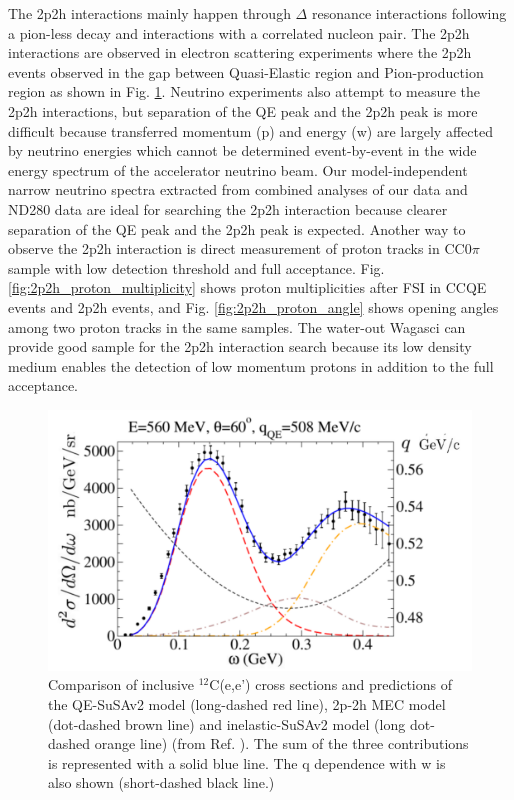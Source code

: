 The 2p2h interactions mainly happen through $\Delta$ resonance interactions following a pion-less decay and interactions with a correlated nucleon pair.
The 2p2h interactions are observed in electron scattering experiments \cite{escattering} where the 2p2h events observed in the gap between Quasi-Elastic region and Pion-production region as shown in Fig. \ref{fig:electrono_scattering_data}.
Neutrino experiments also attempt to measure the 2p2h interactions, but separation of the QE peak and the 2p2h peak is more difficult because transferred momentum (p) and energy (w) are largely affected by  neutrino energies which cannot be determined event-by-event in the wide energy spectrum of the accelerator neutrino beam.
Our model-independent narrow neutrino spectra extracted from combined analyses of our data and ND280 data are ideal for searching the 2p2h interaction because clearer separation of the QE peak and the 2p2h peak is expected.
Another way to observe the 2p2h interaction is direct measurement of proton tracks in CC0$\pi$ sample with low detection threshold and full acceptance.
Fig. \ref{fig:2p2h_proton_multiplicity} shows proton multiplicities after FSI in CCQE events and 2p2h events, and Fig. \ref{fig:2p2h_proton_angle} shows opening angles among two proton tracks in the same samples.
The water-out Wagasci can provide good sample for the 2p2h interaction search because its low density medium enables the detection of low momentum protons in addition to the full acceptance.

\begin{figure}[tbh]
\begin{center}
\includegraphics[width=0.8\linewidth]{fig/escattering.pdf}
\end{center}
\caption{
Comparison of inclusive $^{12}$C(e,e') cross sections and predictions of the QE-SuSAv2 model (long-dashed red line), 2p-2h MEC model (dot-dashed brown line) and inelastic-SuSAv2 model (long dot-dashed orange line) (from Ref. \cite{escattering}).
The sum of the three contributions is represented with a solid blue line.
The q dependence with w is also shown (short-dashed black line.)
}
\label{fig:electrono_scattering_data}
\end{figure}


